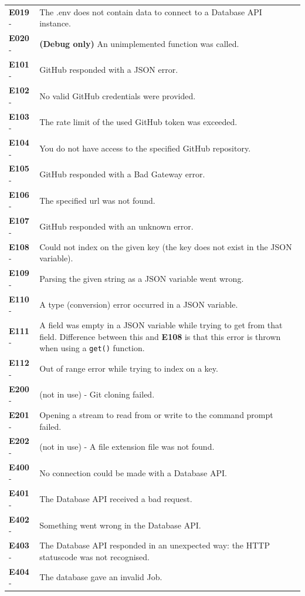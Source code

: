 \documentclass{article}
\begin{document}
\begin{tabularx}{\textwidth}{lX}
    \textbf{E019} - & The .env does not contain data to connect to a Database API instance. \\
    \textbf{E020} - & \textbf{(Debug only)} An unimplemented function was called. \\
    \textbf{E101} - & GitHub responded with a JSON error. \\
    \textbf{E102} - & No valid GitHub credentials were provided. \\
    \textbf{E103} - & The rate limit of the used GitHub token was exceeded.\\
    \textbf{E104} - & You do not have access to the specified GitHub repository.\\  
    \textbf{E105} - & GitHub responded with a Bad Gateway error. \\
    \textbf{E106} - & The specified url was not found. \\
    \textbf{E107} - & GitHub responded with an unknown error.\\
    \textbf{E108} - &  Could not index on the given key (the key does not exist in the JSON variable).\\
    \textbf{E109} - &  Parsing the given string as a JSON variable went wrong.\\
    \textbf{E110} - &  A type (conversion) error occurred in a JSON variable. \\
    \textbf{E111} - &  A field was empty in a JSON variable while trying to get from that field. Difference between this and \textbf{E108} is that this error is thrown when using a \texttt{get()} function.\\
    \textbf{E112} - &  Out of range error while trying to index on a key.\\
    \textbf{E200} - &  (not in use) - Git cloning failed. \\
    \textbf{E201} - &  Opening a stream to read from or write to the command prompt failed.  \\
    \textbf{E202} - &  (not in use) - A file extension file was not found. \\
    \textbf{E400} - & No connection could be made with a Database API. \\
    \textbf{E401} - & The Database API received a bad request. \\
    \textbf{E402} - & Something went wrong in the Database API. \\
    \textbf{E403} - & The Database API responded in an unexpected way: the HTTP statuscode was not recognised. \\
    \textbf{E404} - & The database gave an invalid Job. \\
\end{tabularx}
\end{document}
